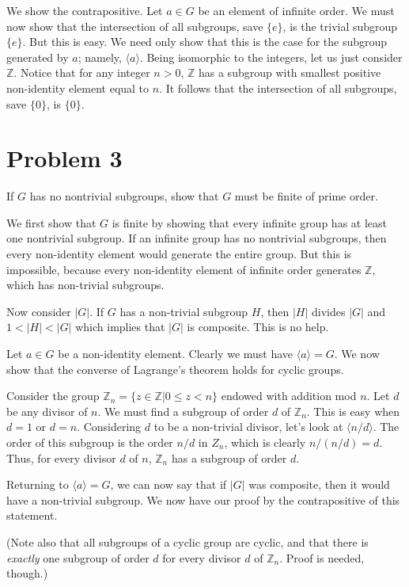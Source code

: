 \documentclass[12pt]{article}
\newcommand{\Z}{\mathbb{Z}}
\begin{document}
We show the contrapositive.  Let $a\in G$ be an element of infinite order.  We must
now show that the intersection of all subgroups, save $\{e\}$, is the trivial subgroup $\{e\}$.
But this is easy.  We need only show that this is the case for the subgroup generated by $a$;
namely, $\langle a\rangle$.  Being isomorphic to the integers, let us just consider $\Z$.
Notice that for any integer $n>0$, $\Z$ has a subgroup with smallest positive non-identity
element equal to $n$.  It follows that the intersection of all subgroups, save $\{0\}$, is $\{0\}$.

\section*{Problem 3}

If $G$ has no nontrivial subgroups, show that $G$ must be finite of prime order.

We first show that $G$ is finite by showing that every infinite group has
at least one nontrivial subgroup.  If an infinite group has no nontrivial subgroups, then
every non-identity element would generate the entire group.  But this is impossible,
because every non-identity element of infinite order generates $\Z$, which has non-trivial subgroups.

Now consider $|G|$.  If $G$ has a non-trivial subgroup $H$, then $|H|$ divides $|G|$
and $1<|H|<|G|$ which implies that $|G|$ is composite.  This is no help.

Let $a\in G$ be a non-identity element.  Clearly we must have $\langle a\rangle=G$.
We now show that the converse of Lagrange's theorem holds for cyclic groups.

Consider the group $\Z_n=\{z\in\Z|0\leq z<n\}$ endowed with addition mod $n$.
Let $d$ be any divisor of $n$.  We must find a subgroup of order $d$ of $\Z_n$.
This is easy when $d=1$ or $d=n$.  Considering $d$ to be a non-trivial divisor,
let's look at $\langle n/d\rangle$.  The order of this subgroup is the order $n/d$ in $Z_n$,
which is clearly $n/(n/d)=d$.  Thus, for every divisor $d$ of $n$, $\Z_n$ has a subgroup of order $d$.

Returning to $\langle a\rangle=G$, we can now say that if $|G|$ was composite,
then it would have a non-trivial subgroup.  We now have our proof by the contrapositive
of this statement.

(Note also that all subgroups of a cyclic group are cyclic, and that there is {\it exactly} one
subgroup of order $d$ for every divisor $d$ of $\Z_n$.  Proof is needed, though.)
\end{document}
